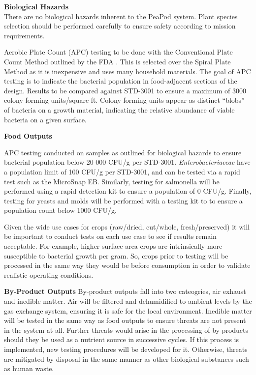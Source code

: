 
\textbf{Biological Hazards}\\
There are no biological hazards inherent to the PeaPod system. Plant species selection should be performed carefully to ensure safety according to mission requirements.

Aerobic Plate Count (APC) testing to be done with the Conventional Plate Count Method outlined by the FDA \cite{platecount}. This is selected over the Spiral Plate Method as it is inexpensive and uses many household materials. The goal of APC testing is to indicate the bacterial population in food-adjacent sections of the design. Results to be compared against STD-3001 to ensure a maximum of 3000 colony forming units/square ft. Colony forming units appear as distinct ``blobs'' of bacteria on a growth material, indicating the relative abundance of viable bacteria on a given surface.

\textbf{Food Outputs}

APC testing conducted on samples as outlined for biological hazards to ensure bacterial population below 20 000 CFU/g per STD-3001. \textit{Enterobacteriaceae} have a population limit of 100 CFU/g per STD-3001, and can be tested via a rapid test such as the MicroSnap EB. Similarly, testing for salmonella will be performed using a rapid detection kit to ensure a population of 0 CFU/g. Finally, testing for yeasts and molds will be performed with a testing kit to to ensure a population count below 1000 CFU/g.

Given the wide use cases for crops (raw/dried, cut/whole, fresh/preserved) it will be important to conduct tests on each use case to see if results remain acceptable. For example, higher surface area crops are intrinsically more susceptible to bacterial growth per gram. So, crops prior to testing will be processed in the same way they would be before consumption in order to validate realistic operating conditions.


\textbf{By-Product Outputs}
By-product outputs fall into two cateogries, air exhaust and inedible matter. Air will be filtered and dehumidified to ambient levels by the gas exchange system, ensuring it is safe for the local environment. Inedible matter will be tested in the same way as food outputs to ensure threats are not present in the system at all. Further threats would arise in the processing of by-products should they be used as a nutrient source in successive cycles. If this process is implemented, new testing procedures will be developed for it. Otherwise, threats are mitigated by disposal in the same manner as other biological substances such as human waste.

